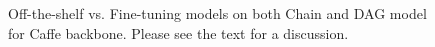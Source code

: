 \documentclass[10pt,twocolumn,letterpaper]{article}
\begin{document}
\begin{figure}[t]
\centering
	
\caption{Off-the-shelf vs. Fine-tuning models on both Chain and DAG model for Caffe backbone. Please see the text for a discussion.}
\label{fig:comp_otf}
\end{figure}


\end{document}

